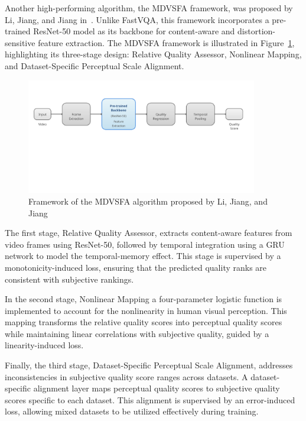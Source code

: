 Another high-performing algorithm, the MDVSFA framework, was proposed by Li, Jiang, and Jiang in~\cite{li2023unified}. Unlike FastVQA, this framework incorporates a pre-trained ResNet-50 model as its backbone for content-aware and distortion-sensitive feature extraction. The MDVSFA framework is illustrated in Figure~\ref{fig:framework2}, highlighting its three-stage design: Relative Quality Assessor, Nonlinear Mapping, and Dataset-Specific Perceptual Scale Alignment.

\begin{figure}
\centering
\includegraphics[width=0.9\textwidth]{figures/unified-vqa-framework-3.png}
\caption{Framework of the MDVSFA algorithm proposed by Li, Jiang, and Jiang~\cite{li2023unified}}
\label{fig:framework2}
\end{figure}

The first stage, Relative Quality Assessor, extracts content-aware features from video frames using ResNet-50, followed by temporal integration using a GRU network to model the temporal-memory effect. This stage is supervised by a monotonicity-induced loss, ensuring that the predicted quality ranks are consistent with subjective rankings.

In the second stage, Nonlinear Mapping a four-parameter logistic function is implemented to account for the nonlinearity in human visual perception. This mapping transforms the relative quality scores into perceptual quality scores while maintaining linear correlations with subjective quality, guided by a linearity-induced loss.

Finally, the third stage, Dataset-Specific Perceptual Scale Alignment, addresses inconsistencies in subjective quality score ranges across datasets. A dataset-specific alignment layer maps perceptual quality scores to subjective quality scores specific to each dataset. This alignment is supervised by an error-induced loss, allowing mixed datasets to be utilized effectively during training.

